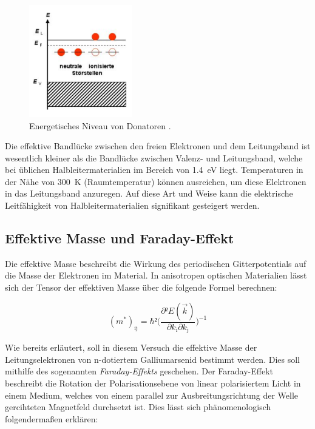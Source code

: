\begin{figure}[H]
    \centering
    \includegraphics[width=0.4\textwidth]{content/nDot.png}
    \caption{Energetisches Niveau von Donatoren \cite{nDotierung}.}
    \label{fig:nDot}
\end{figure}

\noindent Die effektive Bandlücke zwischen den freien Elektronen und dem Leitungsband ist wesentlich kleiner als die Bandlücke 
zwischen Valenz- und Leitungsband, welche bei üblichen Halbleitermaterialien im Bereich von \qty{1.4}{\electronvolt} liegt. Temperaturen 
in der Nähe von \qty{300}{\kelvin} (Raumtemperatur) können ausreichen, um diese Elektronen in das Leitungsband anzuregen. 
Auf diese Art und Weise kann die elektrische Leitfähigkeit von Halbleitermaterialien signifikant gesteigert werden. 

\subsection{Effektive Masse und Faraday-Effekt}

\noindent Die effektive Masse beschreibt die Wirkung des periodischen Gitterpotentials auf die Masse der Elektronen im Material.
In anisotropen optischen Materialien lässt sich der Tensor der effektiven Masse über die folgende Formel berechnen:

\begin{equation}
    (m^{\ast})_{\text{ij}} = \hbar²\biggl(\frac{\partial²E(\vec{k})}{\partial{}k_{\text{i}}\partial{}k_{\text{j}}}\biggr)^{-1}
    \label{eqn:meff}
\end{equation}

\noindent Wie bereits erläutert, soll in diesem Versuch die effektive Masse der Leitungselektronen von n-dotiertem Galliumarsenid bestimmt 
werden. Dies soll mithilfe des sogenannten \textit{Faraday-Effekts} geschehen. Der Faraday-Effekt beschreibt die Rotation der 
Polarisationsebene von linear polarisiertem Licht in einem Medium, welches von einem parallel zur Ausbreitungsrichtung der Welle gercihteten 
Magnetfeld durchsetzt ist. Dies lässt sich phänomenologisch folgendermaßen erklären: \\

